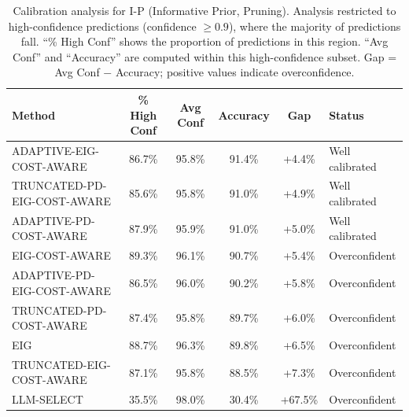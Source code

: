 \begin{table}[htbp]
\centering
\small
\caption{Calibration analysis for I-P (Informative Prior, Pruning). Analysis restricted to high-confidence predictions (confidence $\geq 0.9$), where the majority of predictions fall. ``\% High Conf'' shows the proportion of predictions in this region. ``Avg Conf'' and ``Accuracy'' are computed within this high-confidence subset. Gap = Avg Conf $-$ Accuracy; positive values indicate overconfidence.}
\label{tab:calibration-prune_notuniform}
\begin{tabular}{@{}lccccl@{}}
\toprule
Method & \% High Conf & Avg Conf & Accuracy & Gap & Status \\
\midrule
ADAPTIVE-EIG-COST-AWARE & 86.7\% & 95.8\% & 91.4\% & +4.4\% & Well calibrated \\
TRUNCATED-PD-EIG-COST-AWARE & 85.6\% & 95.8\% & 91.0\% & +4.9\% & Well calibrated \\
ADAPTIVE-PD-COST-AWARE & 87.9\% & 95.9\% & 91.0\% & +5.0\% & Well calibrated \\
EIG-COST-AWARE & 89.3\% & 96.1\% & 90.7\% & +5.4\% & Overconfident \\
ADAPTIVE-PD-EIG-COST-AWARE & 86.5\% & 96.0\% & 90.2\% & +5.8\% & Overconfident \\
TRUNCATED-PD-COST-AWARE & 87.4\% & 95.8\% & 89.7\% & +6.0\% & Overconfident \\
EIG & 88.7\% & 96.3\% & 89.8\% & +6.5\% & Overconfident \\
TRUNCATED-EIG-COST-AWARE & 87.1\% & 95.8\% & 88.5\% & +7.3\% & Overconfident \\
LLM-SELECT & 35.5\% & 98.0\% & 30.4\% & +67.5\% & Overconfident \\
\bottomrule
\end{tabular}
\end{table}